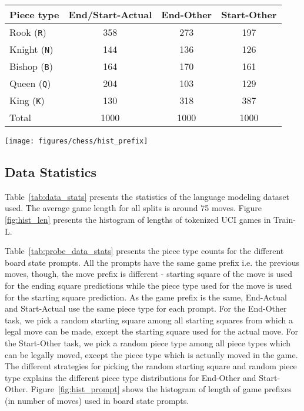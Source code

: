 \documentclass[12pt]{thesis-umich}[thesis]
\newcommand{\pos}[1]{\texttt{#1}}
\begin{document}
\begin{figure*}
	\begin{minipage}{\textwidth}
		\begin{minipage}[b]{0.48\textwidth}
			\centering
			\setlength\tabcolsep{4pt}
			\begin{tabular}{lccc}
				\toprule
				Piece type & End/Start-Actual & End-Other & Start-Other\\ \midrule
				Rook (\pos{R}) & 	358 	& 273     & 197\\ 
				Knight (\pos{N}) & 	144 	& 136 & 126\\  
				Bishop (\pos{B}) & 	164 			& 170 & 161\\
				Queen (\pos{Q}) 	& 	204 	& 103  & 129 \\ 
				
				King (\pos{K}) & 	130 	& 318  & 387\\
				\midrule
				Total & 1000 & 1000 & 1000 \\\bottomrule
			\end{tabular}
			\label{tab:probe_data_stats}
		\end{minipage}
		\hfill
		\begin{minipage}[b]{0.48\textwidth}
			\centering
			\texttt{[image: figures/chess/hist\_prefix]}
			\vspace{-0.1in}
			\label{fig:hist_prompt}
		\end{minipage}
		\end{minipage}
\end{figure*}


\subsection{Data Statistics}
\label{sec:data_stats}
Table~\ref{tab:data_stats} presents the statistics of the language modeling dataset used. The average game length for all splits is around 75 moves.
Figure \ref{fig:hist_len} presents the histogram of lengths of tokenized UCI games in Train-L. 

Table~\ref{tab:probe_data_stats} presents the piece type counts for the different board state prompts. All the prompts have the same game prefix i.e. the previous moves, though, the move prefix is different - starting square of the move is used for the ending square predictions while the piece type used for the move is used for the starting square prediction. As the game prefix is the same, End-Actual and Start-Actual use the same piece type for each prompt. 
For the End-Other task, we pick a random starting square among all starting squares from which a legal move can be made, except the starting square used for the actual move.
For the Start-Other task, we pick a random piece type among all piece types which can be legally moved, except the piece type which is actually moved in the game.
The different strategies for picking the random starting square and random piece type explains the different piece type distributions for End-Other and Start-Other. Figure~\ref{fig:hist_prompt} shows the histogram of length of game prefixes (in number of moves) used in board state prompts.
\end{document}
